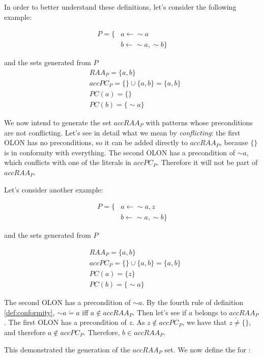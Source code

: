 In order to better understand these definitions, let's consider the following example:

\begin{align*}
P=\{
& a \leftarrow\sim a\\
& b \leftarrow\sim a,\sim b
\}
\end{align*}

and the sets generated from $P$
\begin{align*}
& RAA_{P} = \{a,b\}\\
& accPC_{P} = \{\} \cup \{a,b\} = \{a,b\}\\
& PC(a)=\{\}\\
& PC(b)=\{\sim a\}
\end{align*}

We now intend to generate the set $accRAA_{P}$ with patterns whose preconditions are not conflicting. Let's see in detail what we mean by \emph{conflicting}: the first OLON has no preconditions, so it can be added directly to $accRAA_{P}$, because $\{\}$ is in conformity with everything. The second OLON has a precondition of $\sim a$, which conflicts with one of the literals in $accPC_{P}$. Therefore it will not be part of $accRAA_{P}$.

Let's consider another example:

\begin{align*}
P=\{
& a \leftarrow\sim a,z\\
& b \leftarrow\sim a,\sim b
\}
\end{align*}

and the sets generated from $P$

\begin{align*}
& RAA_{P} = \{a,b\}\\
& accPC_{P} = \{\} \cup \{a,b\} = \{a,b\}\\
& PC(a)=\{z\}\\
& PC(b)=\{\sim a\}
\end{align*}

The second OLON has a precondition of $\sim a$. By the fourth rule of definition \ref{def:conformity}, $\sim a\check{=}a$ iff $a \notin accRAA_{P}$. Then let's see if $a$ belongs to $accRAA_{P}$. The first OLON has a precondition of $z$. As $z\notin accPC_{P}$, we have that $z \check{\neq} \{\}$, and therefore $a\notin accPC_{P}$. Therefore, $b\in accRAA_{P}$.

This demonstrated the generation of the $accRAA_{P}$ set. We now define the \rwfs for \nlps:


